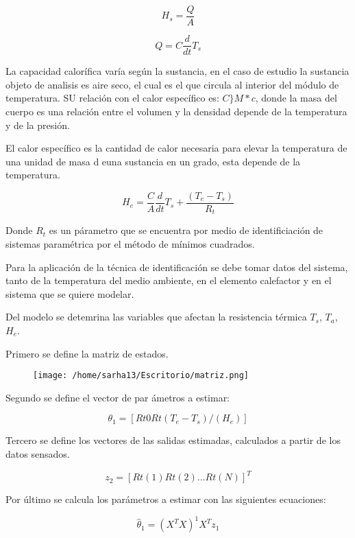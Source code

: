 \documentclass[letter,operight,12pt,spanish]{report}
\begin{document}
\begin{equation}
H_s=\frac{Q}{A}
\end{equation}

\begin{equation}
Q=C\frac{d}{dt}T_s
\end{equation}

La capacidad calor\'ifica var\'ia seg\'un la sustancia, en el caso de estudio la sustancia objeto de analisis es aire seco, el cual es el que circula al interior del m\'odulo de temperatura. SU relaci\'on con el calor espec\'ifico es: $C\}M*c$, donde la masa del cuerpo es una relaci\'on entre el volumen y la densidad depende de la temperatura y de la presi\'on.

El calor espec\'ifico es la cantidad de calor necesaria para elevar la temperatura de una unidad de masa d euna sustancia en un grado, esta depende de la temperatura.

\begin{equation}
H_e=\frac{C}{A}\frac{d}{dt}T_s+\frac{(T_e-T_s)}{R_t}
\end{equation}

Donde $R_t$ es un p\'arametro que se encuentra por medio de identificiaci\'on de sistemas param\'etrica por el m\'etodo de m\'inimos cuadrados.

Para la aplicaci\'on de la t\'ecnica de identificaci\'on se debe tomar datos del sistema, tanto de la temperatura del medio ambiente, en el elemento calefactor y en el sistema que se quiere modelar.

Del modelo se detemrina las variables que afectan la resistencia t\'ermica $T_s$, $T_a$, $H_e$. 

Primero se define la matriz de estados.

\begin{figure}[htp]
\centering
\texttt{[image: /home/sarha13/Escritorio/matriz.png]}
\caption{}
\label{}
\end{figure}

Segundo se define el vector de par \'ametros a estimar:

\begin{equation}
\theta_1=[Rt0	Rt(T_e-T_s)/(H_e)]
\end{equation}

Tercero se define los vectores de las salidas estimadas, calculados a partir de los datos sensados.

\begin{equation}
z_2=[Rt(1) Rt(2)...Rt(N)]^T
\end{equation}

Por \'ultimo se calcula los par\'ametros a estimar con las siguientes ecuaciones:

\begin{equation}
\hat{\theta}_1=(X^TX)^1X^Tz_1
\end{equation}
\end{document}

